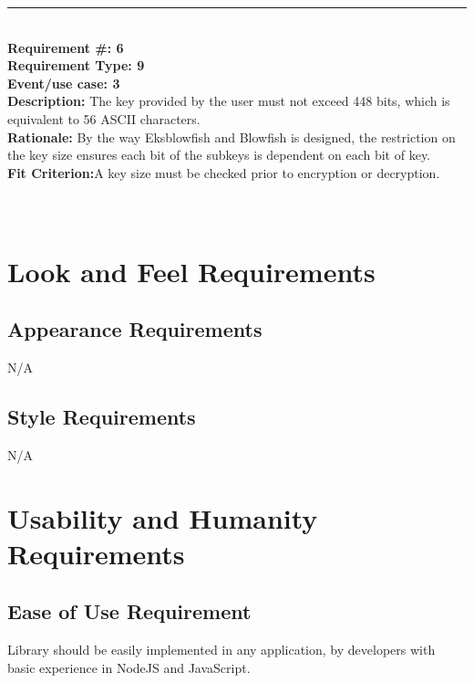 \documentclass[12pt]{article}
\begin{document}
	\noindent\rule{12cm}{0.4pt} \\

	\noindent\textbf{Requirement \#: 6}\\
	\textbf{Requirement Type: 9	}\\
	\textbf{Event/use case: 3 }\\
	\textbf{Description:} The key provided by the user must not exceed 448 bits, which is equivalent to 56 ASCII characters.\\
	\textbf{Rationale:} By the way Eksblowfish and Blowfish is designed, the restriction on the key size ensures each bit of the subkeys is dependent on each bit of key.\\
	\textbf{Fit Criterion:}A key size must be checked prior to encryption or decryption.\\ \\ \\



	

	
\section*{}

\section {Look and Feel Requirements}

\subsection {Appearance Requirements}
N/A

\subsection {Style Requirements}
N/A

\section {Usability and Humanity Requirements}

\subsection {Ease of Use Requirement}
Library should be easily implemented in any application, by developers with basic experience in NodeJS and JavaScript.
\end{document}
